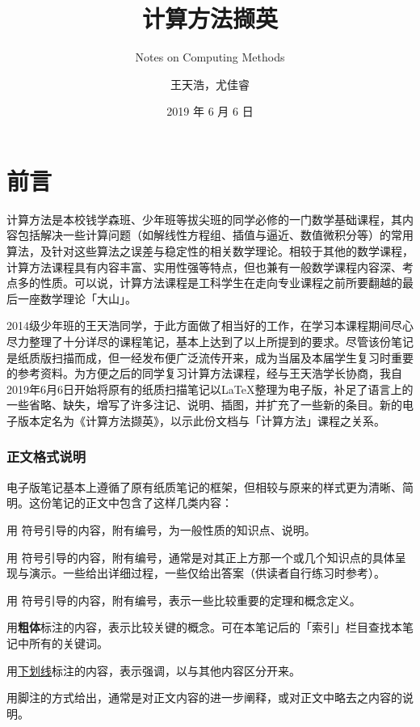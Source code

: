 \documentclass[opensource,b5paper,sourcefont]{qyxf-book}
\title{计算方法撷英}
\subtitle{Notes on Computing Methods}
\author{王天浩，尤佳睿}
\date{2019 年 6 月 6 日}
\newcommand{\tl}{\setlength{\itemsep}{0pt}\setlength{\parskip}{0pt}}
\renewcommand{\emph}[1]{\uline{#1}}
\begin{document}
\maketitle

\frontmatter
\chapter{前言}
计算方法是本校钱学森班、少年班等拔尖班的同学必修的一门数学基础课程，其内容包括解决一些计算问题（如解线性方程组、插值与逼近、数值微积分等）的常用算法，及针对这些算法之误差与稳定性的相关数学理论。相较于其他的数学课程，计算方法课程具有内容丰富、实用性强等特点，但也兼有一般数学课程内容深、考点多的性质。可以说，计算方法课程是工科学生在走向专业课程之前所要翻越的最后一座数学理论「大山」。

2014级少年班的王天浩同学，于此方面做了相当好的工作，在学习本课程期间尽心尽力整理了十分详尽的课程笔记，基本上达到了以上所提到的要求。尽管该份笔记是纸质版扫描而成，但一经发布便广泛流传开来，成为当届及本届学生复习时重要的参考资料。为方便之后的同学复习计算方法课程，经与王天浩学长协商，我自2019年6月6日开始将原有的纸质扫描笔记以\LaTeX 整理为电子版，补足了语言上的一些省略、缺失，增写了许多注记、说明、插图，并扩充了一些新的条目。新的电子版本定名为《计算方法撷英》，以示此份文档与「计算方法」课程之关系。

\subsection*{正文格式说明}
电子版笔记基本上遵循了原有纸质笔记的框架，但相较与原来的样式更为清晰、简明。这份笔记的正文中包含了这样几类内容：
\begin{description}\tl
    \item[条目] 用  符号引导的内容，附有编号，为一般性质的知识点、说明。
    \item[例题] 用  符号引导的内容，附有编号，通常是对其正上方那一个或几个知识点的具体呈现与演示。一些给出详细过程，一些仅给出答案（供读者自行练习时参考）。
    \item[定理/定义] 用  符号引导的内容，附有编号，表示一些比较重要的定理和概念定义。
    \item[关键词] 用\textbf{粗体}标注的内容，表示比较关键的概念。可在本笔记后的「索引」栏目查找本笔记中所有的关键词。
    \item[强调] 用\emph{下划线}标注的内容，表示强调，以与其他内容区分开来。
    \item[注记] 用脚注的方式给出，通常是对正文内容的进一步阐释，或对正文中略去之内容的说明。
\end{description}
\end{document}
